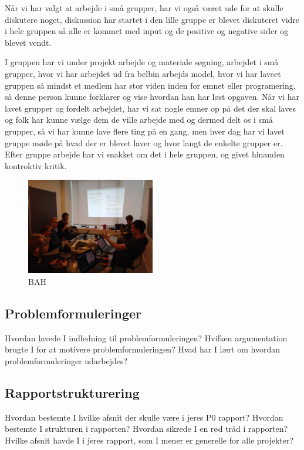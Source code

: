 \documentclass[a4paper,12pt,twoside,openright]{memoir}
\begin{document}
            Når vi har valgt at arbejde i små grupper, har vi også været ude for at skulle diskutere noget, diskussion har startet i den lille gruppe er blevet diskuteret vidre i hele gruppen så alle er kommet med input og de positive og negative sider og blevet vendt.

            I gruppen har vi under projekt arbejde og materiale søgning, arbejdet i små grupper, hvor vi har arbejdet ud fra belbin arbejds model, hvor vi har laveet  gruppen så mindst et medlem har stor viden inden for emnet eller programering, så denne person kunne forklarer og vise hvordan han har løst opgaven. 
            Når vi har lavet grupper og fordelt arbejdet, har vi sat nogle emner op på det der skal laves og folk har kunne vælge dem de ville arbejde med og dermed delt os i små grupper, så vi har kunne lave flere ting på en gang, men hver dag har vi lavet gruppe møde på hvad der er blevet laver  og hvor langt de enkelte grupper er. Efter gruppe arbejde har vi snakket om det i hele gruppen, og givet  hinanden kontroktiv kritik.

            \begin{figure}[ht!]
                \centering
                \includegraphics[width=0.5\textwidth]{Images/8.jpg}
                \caption{BAH}
                \label{4}
            \end{figure}

        

        \subsection{Problemformuleringer}
        Hvordan lavede I indledning til problemformuleringen?
        Hvilken argumentation brugte I for at motivere problemformuleringen?
        Hvad har I lært om hvordan problemformuleringer udarbejdes?

        \subsection{Rapportstrukturering}
        Hvordan bestemte I hvilke afsnit der skulle være i jeres P0 rapport?
        Hvordan bestemte I strukturen i rapporten?
        Hvordan sikrede I en rød tråd i rapporten?
        Hvilke afsnit havde I i jeres rapport, som I mener er generelle for alle projekter?
\end{document}
